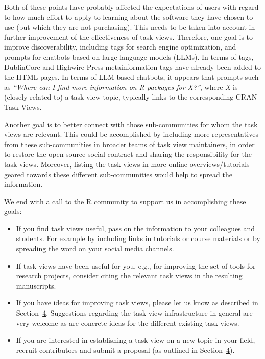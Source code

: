 Both of these points have probably affected the expectations of users with regard to how
much effort to apply to learning about the software they have chosen to use (but
which they are not purchasing). This needs to be taken into account in further improvement
of the effectiveness of task views.
Therefore, one goal is to improve discoverability, including tags for search engine optimization,
and prompts for chatbots based on large language models (LLMs). In terms of tags, DublinCore and
Highwire Press metainformation tags have already been added to the HTML pages. In terms of
LLM-based chatbots, it appears that prompts such as \emph{``Where can I find more information on R
packages for X?''}, where \emph{X} is (closely related to) a task view topic, typically links to
the corresponding CRAN Task Views.

Another goal is to better connect with those sub-communities for whom the task views are
relevant. This could be accomplished by including more representatives from these sub-communities
in broader teams of task view maintainers, in order to restore the open source social contract
and sharing the responsibility for the task views. Moreover, listing the task views
in more online overviews/tutorials geared towards these different sub-communities
would help to spread the information.

We end with a call to the R community to support us in accomplishing these goals:

\begin{itemize}
\item
  If you find task views useful, pass on the information to your colleagues and students. For
  example by including links in tutorials or course materials or by spreading the word on your
  social media channels.
\item
  If task views have been useful for you, e.g., for improving the set of tools for research
  projects, consider citing the relevant task views in the resulting manuscripts.
\item
  If you have ideas for improving task views, please let us know as described in
  Section~\hyperref[sec:contributing]{4}. Suggestions regarding the task view infrastructure in
  general are very welcome as are concrete ideas for the different existing task views.
\item
  If you are interested in establishing a task view on a new topic in your field,
  recruit contributors and submit a proposal (as outlined in Section~\hyperref[sec:contributing]{4}).
\end{itemize}

